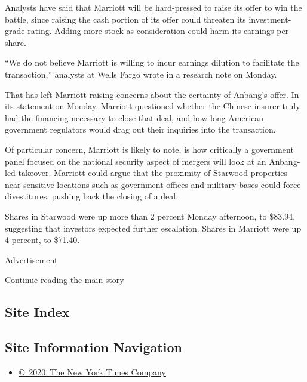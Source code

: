 Analysts have said that Marriott will be hard-pressed to raise its offer
to win the battle, since raising the cash portion of its offer could
threaten its investment-grade rating. Adding more stock as consideration
could harm its earnings per share.

``We do not believe Marriott is willing to incur earnings dilution to
facilitate the transaction,'' analysts at Wells Fargo wrote in a
research note on Monday.

That has left Marriott raising concerns about the certainty of Anbang's
offer. In its statement on Monday, Marriott questioned whether the
Chinese insurer truly had the financing necessary to close that deal,
and how long American government regulators would drag out their
inquiries into the transaction.

Of particular concern, Marriott is likely to note, is how critically a
government panel focused on the national security aspect of mergers will
look at an Anbang-led takeover. Marriott could argue that the proximity
of Starwood properties near sensitive locations such as government
offices and military bases could force divestitures, pushing back the
closing of a deal.

Shares in Starwood were up more than 2 percent Monday afternoon, to
\$83.94, suggesting that investors expected further escalation. Shares
in Marriott were up 4 percent, to \$71.40.

Advertisement

\protect\hyperlink{after-bottom}{Continue reading the main story}

\hypertarget{site-index}{%
\subsection{Site Index}\label{site-index}}

\hypertarget{site-information-navigation}{%
\subsection{Site Information
Navigation}\label{site-information-navigation}}

\begin{itemize}
\tightlist
\item
  \href{https://help.nytimes.com/hc/en-us/articles/115014792127-Copyright-notice}{©~2020~The
  New York Times Company}
\end{itemize}

